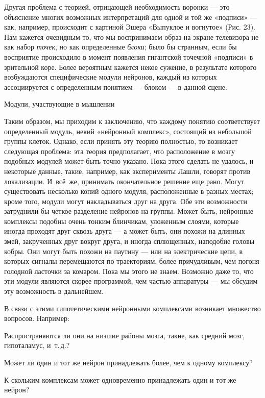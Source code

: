 \documentclass[../main.tex]{subfiles}
\begin{document}
Другая проблема с теорией, отрицающей необходимость воронки --- это объяснение многих возможных интерпретаций для одной и той же «подписи» --- как, например, происходит с картиной Эшера «Выпуклое и вогнутое» (Рис. 23). Нам кажется очевидным то, что мы воспринимаем образ на экране телевизора не как набор \emph{точек}, но как определенные \emph{блоки}; было бы странным, если бы восприятие происходило в момент появления гигантской точечной «подписи» в зрительной коре. Более вероятным кажется некое сужение, в результате которого возбуждаются специфические модули нейронов, каждый из которых ассоциируется с определенным понятием --- блоком --- в данной сцене.~~

Модули, участвующие в мышлении

Таким образом, мы приходим к заключению, что каждому понятию соответствует определенный модуль, некий «нейронный комплекс», состоящий из небольшой группы клеток. Однако, если принять эту теорию полностью, то возникает следующая проблема: эта теория предполагает, что расположение в мозгу подобных модулей может быть точно указано. Пока этого сделать не удалось, и некоторые данные, такие, например, как эксперименты Лашли, говорят против локализации. И~всё~же, принимать окончательное решение еще рано. Могут существовать несколько копий одного модуля, расположенные в разных местах; кроме того, модули могут накладываться друг на друга. Обе эти возможности затруднили бы четкое разделение нейронов на группы. Может быть, нейронные комплексы подобны очень тонким блинчикам, уложенным слоями, которые иногда проходят друг сквозь друга --- а может быть, они похожи на длинных змей, закрученных друг вокруг друга, и иногда сплющенных, наподобие головы кобры. Они могут быть похожи на паутину --- или на электрические цепи, в которых сигналы перемещаются по траекториям, более причудливым, чем погоня голодной ласточки за комаром. Пока мы этого не знаем. Возможно даже то, что эти модули являются скорее программой, чем частью аппаратуры --- мы обсудим эту возможность в дальнейшем.

В связи с этими гипотетическими нейронными комплексами возникает множество вопросов. Например:

Распространяются ли они на низшие районы мозга, такие, как средний мозг, гипоталамус, и~т.\,д.?

Может ли один и тот же нейрон принадлежать более, чем к одному комплексу?

К скольким комплексам может одновременно принадлежать один и тот же нейрон?
\end{document}
